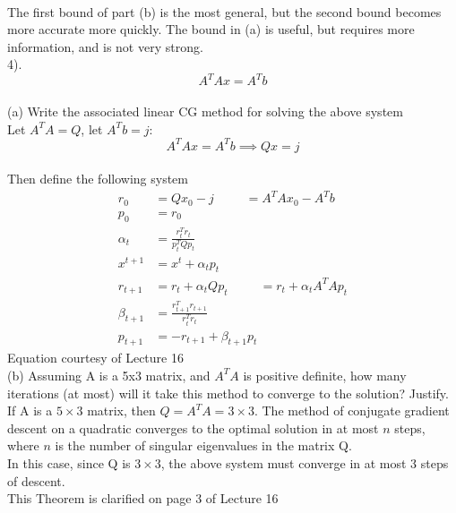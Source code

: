 \documentclass[12pt,letterpaper]{article}
\begin{document}
\\
The first bound of part (b) is the most general, but the second bound becomes more accurate more quickly. The bound in (a) is useful, but requires more information, and is not very strong.
\vspace{10pt}
\\
4).
\[ A^T A x = A^T b\]
\vspace{10pt}
\\
(a) Write the associated linear CG method for solving the above system
\vspace{10pt}\\
Let $A^T A = Q$, let $A^T b = j$:
\[ A^T A x = A^T b \implies Qx = j\]
\\
Then define the following system
\begin{equation*}
    \begin{split}
        r_0 &= Qx_0 - j \hspace{30pt}= A^T A x_0 - A^T b
        \\
        p_0 &= r_0
        \\
        \alpha_t &= \frac{r_t^T r_t}{p_t^T Q p_t} 
        \\
        x^{t+1} &= x^t + \alpha_t p_t
        \\
        r_{t+1} &= r_t + \alpha_t Q p_t \hspace{30pt}=  r_t + \alpha_t A^T A p_t
        \\
        \beta_{t+1} &= \frac{r_{t+1}^T r_{t+1}}{r_t^T r_t}
        \\
        p_{t+1} &= -r_{t+1} + \beta_{t+1}p_t
    \end{split}
\end{equation*}
Equation courtesy of Lecture 16
\vspace{10pt}
\\
(b) Assuming A is a 5x3 matrix, and $A^T A$ is positive definite, how many iterations (at most) will it take this method to converge to the solution? Justify.
\vspace{10pt}\\
If A is a $5 \times 3$ matrix, then $Q = A^T A = 3 \times 3$. The method of conjugate gradient descent on a quadratic converges to the optimal solution in at most $n$ steps, where $n$ is the number of singular eigenvalues in the matrix Q. 
\\
In this case, since Q is $3 \times 3$, the above system must converge in at most 3 steps of descent. 
\vspace{10pt}
\\
This Theorem is clarified on page 3 of Lecture 16
\end{document}
